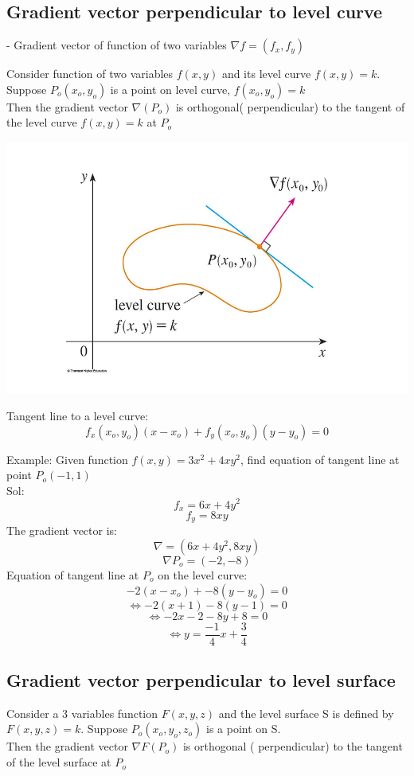 \documentclass[12pt]{article}
\begin{document}
\subsection{Gradient vector perpendicular to level curve}
- Gradient vector of function of two variables $\nabla f = (f_x, f_y)$
\begin{mybox}
    Consider function of two variables $f(x,y)$ and its level curve $f(x,y) = k$. Suppose $P_o(x_o,y_o)$ is a point on level curve, $f(x_o,y_o) = k$\\
    Then the gradient vector $\nabla (P_o)$ is orthogonal( perpendicular) to the tangent of the level curve $f(x,y) = k$ at $P_o$   
    
\end{mybox}
\begin{center}
    \includegraphics[scale  = 0.5]{8.png}
\end{center}

\begin{mybox}
    Tangent line to a level curve: 
    $$f_x(x_o,y_o)(x -x_o) +f_y(x_o,y_o)(y-y_o) = 0$$
\end{mybox}
Example: Given function $f(x,y) = 3x^2 + 4xy^2$, find equation of tangent line at point $P_o(-1,1)$\\
Sol:\\
$$f_x = 6x + 4y^2$$
$$f_y = 8xy$$
The gradient vector is:$$ \nabla = (6x +4y^2, 8xy)$$
$$\nabla P_o = (-2, -8)$$
Equation of tangent line at $P_o$ on the level curve:
$$-2( x - x_o)+ -8(y - y_o) = 0$$
$$\Leftrightarrow -2(x +1) -8(y -1) = 0$$
$$\Leftrightarrow -2x -2 -8y + 8 = 0$$
$$\Leftrightarrow y = \frac{-1}{4} x + \frac{3}{4}$$
\subsection{Gradient vector perpendicular to level surface}
\begin{mybox}
    Consider a 3 variables function $F(x,y,z)$ and the level surface S is defined by $F(x,y,z) = k$. Suppose $P_o(x_o,y_o,z_o)$ is a point on S. \\
    Then the gradient vector $\nabla F(P_o)$ is orthogonal ( perpendicular) to the tangent of the level surface at $P_o$
\end{mybox}
\end{document}
